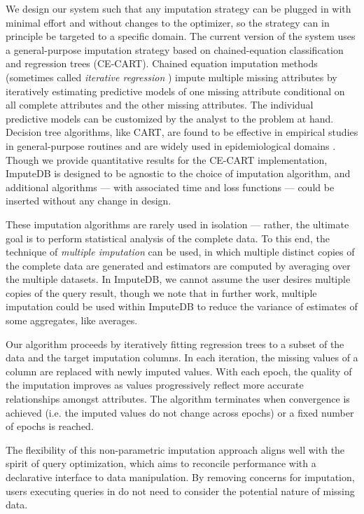 We design our system such that any imputation strategy can be plugged in with minimal effort
and without changes to the optimizer, so the strategy can in principle be targeted to a
specific domain. The current version of the system uses a general-purpose imputation
strategy based on chained-equation classification and regression trees (CE-CART). Chained
equation imputation methods \cite{vanbuuren2011mice} (sometimes called \textit{iterative
regression} \cite{gelman2006data}) impute multiple missing attributes by
iteratively estimating predictive models of one missing attribute conditional on all
complete attributes and the other missing attributes. The individual predictive models can
be customized by the analyst to the problem at hand. Decision tree algorithms, like CART,
are found to be effective \cite{akande2015empirical} in empirical studies in general-purpose
routines and are widely used in epidemiological domains \cite{burgette2010multiple}. Though
we provide quantitative results for the CE-CART implementation, ImputeDB is designed to be
agnostic to the choice of imputation algorithm, and additional algorithms --- with
associated time and loss functions --- could be inserted without any change in design.

These imputation algorithms are rarely used in isolation --- rather, the ultimate goal is to
perform statistical analysis of the complete data. To this end, the technique of
\textit{multiple imputation} can be used, in which multiple distinct copies of the complete
data are generated and estimators are computed by averaging over the multiple datasets. In
ImputeDB, we cannot assume the user desires multiple copies of the query result, though we
note that in further work, multiple imputation could be used within ImputeDB to reduce the
variance of estimates of some aggregates, like averages.

Our algorithm proceeds by iteratively fitting regression trees to a subset of the data and
the target imputation columns. In each iteration, the missing values of a column are
replaced with newly imputed values. With each epoch, the quality of the imputation improves
as values progressively reflect more accurate relationships amongst attributes. The
algorithm terminates when convergence is achieved (i.e. the imputed values do not change across
epochs) or a fixed number of epochs is reached. 

The flexibility of this non-parametric imputation approach aligns well with the spirit of
query optimization, which aims to reconcile performance with a declarative interface to data
manipulation. By removing concerns for imputation, users executing queries in \ProjectName{}
do not need to consider the potential nature of missing data.

